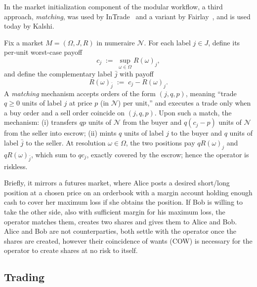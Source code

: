 
In the market initialization component of the modular workflow, a third approach, \textit{matching}, was used by InTrade~\cite{intrade} and a variant by Fairlay~\cite{fairlay}, and is used today by Kalshi. 

\begin{definition}[Matching]\label{def:matching}
Fix a market $M=(\Omega,J,R)$ in numeraire $\mathcal{N}$. For each label $j\in J$, define its per-unit worst-case payoff
\[
c_j \;:=\; \sup_{\omega\in\Omega} R(\omega)_j,
\]
and define the complementary label $\bar{j}$ with payoff
\[
R(\omega)_{\bar{j}} \;:=\; c_j - R(\omega)_j.
\]
A \emph{matching} mechanism accepts orders of the form $(j,q,p)$, meaning ``trade $q\ge 0$ units of label $j$ at price $p$ (in $\mathcal{N}$) per unit,'' and executes a trade only when a buy order and a sell order coincide on $(j,q,p)$. Upon such a match, the mechanism:
(i) transfers $qp$ units of $\mathcal{N}$ from the buyer and $q(c_j-p)$ units of $\mathcal{N}$ from the seller into escrow;
(ii) mints $q$ units of label $j$ to the buyer and $q$ units of label $\bar{j}$ to the seller.
At resolution $\omega\in\Omega$, the two positions pay $qR(\omega)_j$ and $qR(\omega)_{\bar{j}}$, which sum to $qc_j$, exactly covered by the escrow; hence the operator is riskless.
\end{definition}

Briefly, it mirrors a futures market, where Alice posts a desired short/long position at a chosen price on an orderbook with a margin account holding enough cash to cover her maximum loss if she obtains the position. If Bob is willing to take the other side, also with sufficient margin for his maximum loss, the operator matches them, creates two shares and gives them to Alice and Bob. Alice and Bob are not counterparties, both settle with the operator once the shares are created, however their coincidence of wants (COW) is necessary for the operator to create shares at no risk to itself. 


\subsection{Trading}\label{wf:trade}

